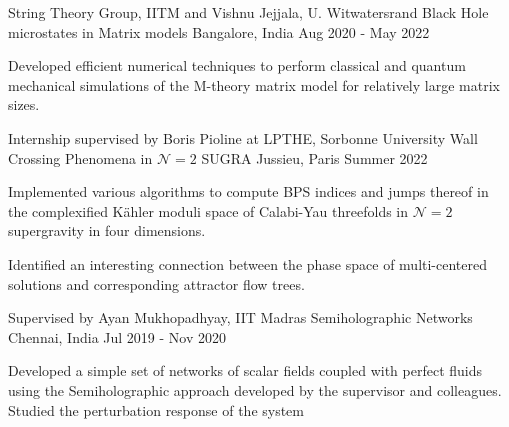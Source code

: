 \begin{cventries}
  \cventry
    {String Theory Group, IITM and Vishnu Jejjala, U. Witwatersrand} %
    {Black Hole microstates in Matrix models} %
    {Bangalore, India} %
    {Aug 2020 - May 2022} %
    {
      \begin{cvitems} %
        \item {Developed efficient numerical techniques to perform classical and quantum mechanical simulations of the M-theory matrix model for relatively large matrix sizes.}
      \end{cvitems}
    }
    
  \cventry
    {Internship supervised by Boris Pioline at LPTHE, Sorbonne University} %
    {Wall Crossing Phenomena in $\mathcal{N}=2$ SUGRA} %
    {Jussieu, Paris} %
    {Summer 2022} %
    {
      \begin{cvitems} %
        \item {Implemented various algorithms to compute BPS indices and jumps thereof in the complexified Kähler moduli space of Calabi-Yau threefolds in $\mathcal{N} = 2$ supergravity in four dimensions.}
        \item {Identified an interesting connection between the phase space of multi-centered solutions and corresponding attractor flow trees.}
      \end{cvitems}
    }



\cventry
    {Supervised by Ayan Mukhopadhyay, IIT Madras} %
    {Semiholographic Networks} %
    {Chennai, India} %
    {Jul 2019 - Nov 2020} %
    {
      \begin{cvitems} %
        \item {Developed a simple set of networks of scalar fields coupled with perfect fluids using the Semiholographic approach developed by the supervisor and colleagues. Studied the perturbation response of the system}
      \end{cvitems}
    }



\end{cventries}
